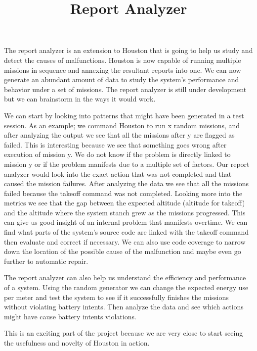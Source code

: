 \documentclass[11pt, a4paper]{article}
\begin{document}
\title{Report Analyzer}
\maketitle


\begin{large}
The report analyzer is an extension to Houston that is going to help us study and detect the causes of malfunctions. Houston is now capable of running multiple missions in sequence and annexing the resultant reports into one. We can now generate an abundant amount of data to study the system's performance and behavior under a set of missions. The report analyzer is still under development but we can brainstorm in the ways it would work. 

We can start by looking into patterns that might have been generated in a test session. As an example; we command Houston to run x random missions, and after analyzing the output we see that all the missions after y are flagged as failed. This is interesting because we see that something goes wrong after execution of mission y. We do not know if the problem is directly linked to mission y or if the problem manifests due to a multiple set of factors. Our report analyzer would look into the exact action that was not completed and that caused the mission failures. After analyzing the data we see that all the missions failed because the takeoff command was not completed. Looking more into the metrics we see that the gap between the expected altitude (altitude for takeoff) and the altitude where the system stanch grew as the missions progressed. This can give us good insight of an internal problem that manifests overtime. We can find what parts of the system's source code are linked with the takeoff command then evaluate and correct if necessary. We can also use code coverage to narrow down the location of the possible cause of the malfunction and maybe even go further to automatic repair. 

The report analyzer can also help us understand the efficiency and performance of a system. Using the random generator we can change the expected energy use per meter and test the system to see if it successfully finishes the missions without violating battery intents. Then analyze the data and see which actions might have cause battery intents violations. 

This is an exciting part of the project because we are very close to start seeing the usefulness and novelty of Houston in action. 



\end{large}
\end{document}
